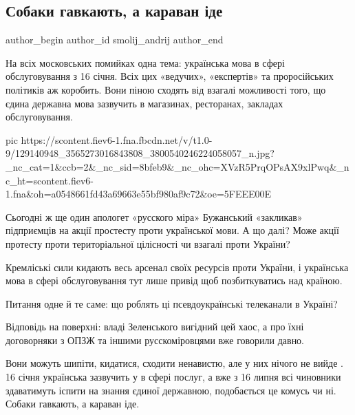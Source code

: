  
 
 
 
 
 
\subsection{Собаки гавкають, а караван іде}
\label{sec:02_12_2020.fb.smolij_andrij.1.mova_karavan_ide}
\ifcmt
	author_begin
   author_id smolij_andrij
	author_end
\fi

На всіх московських помийках одна тема: українська мова в сфері обслуговування
з 16 січня. Всіх цих «ведучих», «експертів» та проросійських політиків аж
коробить. Вони піною сходять від взагалі можливості того, що єдина державна
мова зазвучить в магазинах, ресторанах, закладах обслуговування.

\ifcmt
pic https://scontent.fiev6-1.fna.fbcdn.net/v/t1.0-9/129140948_3565273016843808_3800540246224058057_n.jpg?_nc_cat=1&ccb=2&_nc_sid=8bfeb9&_nc_ohc=XVzR5PrqOPsAX9xlPwq&_nc_ht=scontent.fiev6-1.fna&oh=a0548661fd43a69663e55bf980af9c72&oe=5FEEE00E
\fi

Сьогодні ж ще один апологет «русского міра» Бужанський «закликав» підприємців
на акції простесту проти української мови. А що далі? Може акції протесту проти
територіальної цілісності чи взагалі проти України? 

Кремліські сили кидають весь арсенал своїх ресурсів проти України, і українська
мова в сфері обслуговування тут лише привід щоб позбиткуватись над країною.

Питання одне й те саме: що роблять ці псевдоукраїнські телеканали в Україні? 

Відповідь на поверхні: владі Зеленського вигідний цей хаос, а про їхні
договорняки з ОПЗЖ та іншими русскоміровцями вже говорили давно.

Вони можуть шипіти, кидатися, сходити ненавистю, але у них нічого не вийде .
16 січня українська зазвучить у в сфері послуг, а вже з 16 липня \dshM всі
чиновники здаватимуть іспити на знання єдиної державною, подобається це комусь
чи ні. Собаки гавкають, а караван іде.

